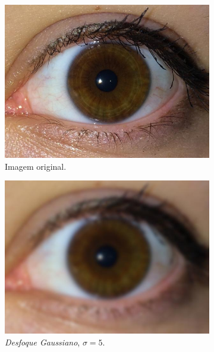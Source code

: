 \begin{figure}[H]
\centering
\begin{subfigure}{0.25\textwidth}
  \includegraphics[width=\linewidth]{img/Resultados/ruidos/original.jpg}
  \caption{Imagem original.}
\end{subfigure}\vfil
\centering %
\begin{subfigure}{0.25\textwidth}
  \includegraphics[width=\linewidth]{img/Resultados/ruidos/gaussian5.jpg}
  \caption{\textit{Desfoque Gaussiano}, $\sigma=5$.}
\end{subfigure}\hfil %
\begin{subfigure}{0.25\textwidth}

\end{subfigure}
\end{figure}
